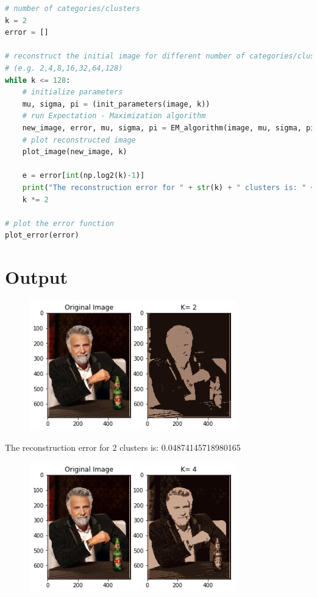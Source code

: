 \documentclass[11pt]{article}
\begin{document}
\begin{lstlisting}[language = Python]
# number of categories/clusters
k = 2
error = []

# reconstruct the initial image for different number of categories/clusters 
# (e.g. 2,4,8,16,32,64,128)
while k <= 128:
    # initialize parameters
    mu, sigma, pi = (init_parameters(image, k))
    # run Expectation - Maximization algorithm
    new_image, error, mu, sigma, pi = EM_algorithm(image, mu, sigma, pi, error)
    # plot reconstructed image
    plot_image(new_image, k)

    e = error[int(np.log2(k)-1)]
    print("The reconstruction error for " + str(k) + " clusters is: " + str(e)
    k *= 2
    
# plot the error function
plot_error(error)
\end{lstlisting}

\newpage
\section{Output}


\begin{figure}[H]
		\centering
		\includegraphics[width=0.8\textwidth]{./Project_2_files/Project_2_33_0.png}
	\end{figure}


The reconstruction error for 2 clusters is: 0.04874145718980165

\begin{figure}[H]
		\centering
		\includegraphics[width=0.8\textwidth]{./Project_2_files/Project_2_33_3.png}
	\end{figure}
\end{document}
